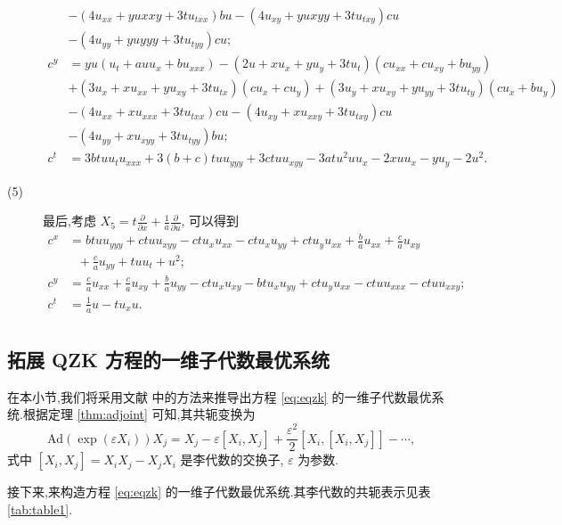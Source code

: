 \begin{description}
\begin{equation*}
\begin{aligned}
&-(4u_{xx}+yu{xxy}+3tu_{txx})bu-(4u_{xy}+yu{xyy}+3tu_{txy})cu\\
&-(4u_{yy}+yu{yyy}+3tu_{tyy})cu;\\
c^{y}&=yu(u_{t}+auu_{x}+bu_{xxx})-(2u+xu_{x}+yu_{y}+3tu_{t})(cu_{xx}+cu_{xy}+bu_{yy})\\
&+(3u_{x}+xu_{xx}+yu_{xy}+3tu_{tx})(cu_{x}+cu_{y})+(3u_{y}+xu_{xy}+yu_{yy}+3tu_{ty})(cu_{x}+bu_{y})\\
&-(4u_{xx}+xu_{xxx}+3tu_{txx})cu-(4u_{xy}+xu_{xxy}+3tu_{txy})cu\\
&-(4u_{yy}+xu_{xyy}+3tu_{tyy})bu;\\
c^{t}&=3btuu_{t}u_{xxx}+3(b+c)tuu_{yyy}+3ctuu_{xyy}-3atu^2uu_x-2xuu_x-yu_y-2u^2.
\end{aligned}
\end{equation*}

\item[(5)] 最后,考虑 $X_{5}=t\frac{\partial}{\partial x}+\frac{1}{a}\frac{\partial}{\partial u}$, 可以得到
\begin{equation*}
\begin{aligned}
c^{x}&=btuu_{yyy}+ctuu_{xyy}-ctu_{x}u_{xx}-ctu_{x}u_{yy}+ctu_{y}u_{xx}+\frac{b}{a}u_{xx}+\frac{c}{a}u_{xy}\\
&~~~+\frac{c}{a}u_{yy}+tuu_t+u^2;\\
c^{y}&=\frac{c}{a}u_{xx}+\frac{c}{a}u_{xy}+\frac{b}{a}u_{yy}-ctu_{x}u_{xy}-btu_{x}u_{yy}+ctu_{y}u_{xx}-ctuu_{xxx}-ctuu_{xxy};\\
c^{t}&=\frac{1}{a}u-tu_{x}u.\\
\end{aligned}
\end{equation*}
\end{description}

\subsection{拓展 QZK 方程的一维子代数最优系统}\label{sec:05optimal}
在本小节,我们将采用文献 \cite{peter2000sym} 中的方法来推导出方程 \eqref{eq:eqzk} 的一维子代数最优系统.根据定理 \ref{thm:adjoint} 可知,其共轭变换为
\begin{equation*}
	\mbox{Ad}(\exp(\varepsilon X_i))X_j=X_j-\varepsilon[X_i,X_j]+\frac{\varepsilon^2}{2}[X_i,[X_i,X_j]]-\cdots,
\end{equation*}
式中 $[X_i,X_j]=X_iX_j-X_jX_i$ 是李代数的交换子, $\varepsilon$ 为参数.

接下来,来构造方程 \eqref{eq:eqzk} 的一维子代数最优系统.其李代数的共轭表示见表 \ref{tab:table1}.

